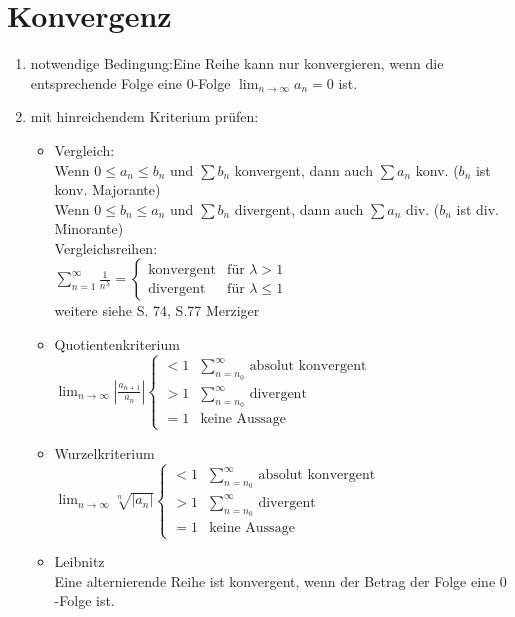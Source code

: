 \documentclass{scrreprt}
\begin{document}
\section{Konvergenz}
\begin{enumerate}
\item notwendige Bedingung:Eine Reihe kann nur konvergieren, wenn die entsprechende Folge eine $0$-Folge $\lim_{n\to\infty}a_n=0$ ist.
\item mit hinreichendem Kriterium prüfen:
\begin{itemize}
\item Vergleich:\\
Wenn $0\leq a_n\leq b_n$ und $\sum b_n$ konvergent, dann auch $\sum a_n$ konv. ($b_n$ ist konv. Majorante)\\
Wenn $0\leq b_n \leq a_n$ und $\sum b_n$ divergent, dann auch $\sum a_n$ div. ($b_n$ ist div. Minorante)\\
Vergleichsreihen: \\
$\sum_{n=1}^{\infty} \frac{1}{n^\lambda}=\begin{cases}
\text{konvergent} & \text{für }\lambda >1 \\
\text{divergent} & \text{für }\lambda \leq 1 
\end{cases}$\\
weitere siehe S. 74, S.77 Merziger
\item Quotientenkriterium\\
$\lim_{n\to \infty} \left| \frac{a_{n+1}}{a_n}\right|\begin{cases}
<1 & \sum_{n=n_0}^\infty \text{ absolut konvergent}\\
>1 & \sum_{n=n_0}^\infty \text{ divergent}\\
=1 & \text{keine Aussage}
\end{cases}$
\item Wurzelkriterium\\
$\lim_{n\to \infty} \sqrt[n]{|a_n|} \begin{cases}
<1 & \sum_{n=n_0}^\infty \text{ absolut konvergent}\\
>1 & \sum_{n=n_0}^\infty \text{ divergent}\\
=1 & \text{keine Aussage}
\end{cases}$
\item Leibnitz\\
Eine alternierende Reihe ist konvergent, wenn der Betrag der Folge eine $0$-Folge ist.
\end{itemize}
\end{enumerate} 
\end{document}
